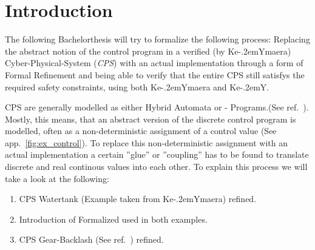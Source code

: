 
\chapter{Introduction}
\label{ch:Introduction}

The following Bachelorthesis will try to formalize the following process: Replacing the abstract notion of the control program in a verified (by Ke\kern-.2emYmaera) Cyber-Physical-System (\textit{CPS}) with an actual implementation through a form of Formal Refinement and being able to verify that the entire CPS still satisfys the required safety constraints, using both Ke\kern-.2emYmaera and Ke\kern-.2emY. 

CPS are generally modelled as either Hybrid Automata or - Programs.(See ref.~\cite{platzerb}). Mostly, this means, that an abstract version of the discrete control program is modelled, often as a non-deterministic assignment of a control value (See app.~\ref{fig:ex_control}). To replace this non-deterministic assignment with an actual implementation a certain ''glue'' or ''coupling'' has to be found to translate discrete and real continous values into each other. To explain this process we will take a look at the following: 

\begin{enumerate}[label=\bfseries \Roman*:]

\item CPS Watertank (Example taken from Ke\kern-.2emYmaera) refined.
\item Introduction of Formalized used in both examples.
\item CPS Gear-Backlash (See ref.~\cite{bla}) refined.
\end{enumerate}





